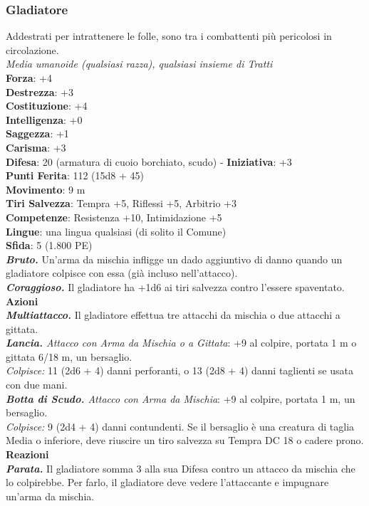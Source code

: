 \begin{multicols}{2}
\subsubsection{Gladiatore}
Addestrati per intrattenere le folle, sono tra i combattenti più pericolosi in circolazione.\\
\emph{Media umanoide (qualsiasi razza), qualsiasi insieme di Tratti}\\
\textbf{Forza}: +4\\
\textbf{Destrezza}: +3\\
\textbf{Costituzione}: +4\\
\textbf{Intelligenza}: +0\\
\textbf{Saggezza}: +1\\
\textbf{Carisma}: +3\\
\textbf{Difesa}: 20 (armatura di cuoio borchiato, scudo) - \textbf{Iniziativa}: +3\\
\textbf{Punti Ferita}: 112 (15d8 + 45)\\
\textbf{Movimento}: 9 m\\
\textbf{Tiri Salvezza}: Tempra +5, Riflessi +5, Arbitrio +3 \\
\textbf{Competenze}: Resistenza +10, Intimidazione +5\\
\textbf{Lingue}: una lingua qualsiasi (di solito il Comune)\\
\textbf{Sfida}: 5 (1.800 PE)\smallskip\\
\emph{\textbf{Bruto.}} Un'arma da mischia infligge un dado aggiuntivo di danno quando un gladiatore colpisce con essa (già incluso nell'attacco).\\
\emph{\textbf{Coraggioso.}} Il gladiatore ha +1d6 ai tiri salvezza contro l'essere spaventato.\\
\smallskip\textbf{Azioni}\\
\emph{\textbf{Multiattacco.}} Il gladiatore effettua tre attacchi da mischia o due attacchi a gittata.\\
\emph{\textbf{Lancia.} Attacco con Arma da Mischia o a Gittata}: +9 al colpire, portata 1 m o gittata 6/18 m, un bersaglio.\\
\emph{Colpisce:} 11 (2d6 + 4) danni perforanti, o 13 (2d8 + 4) danni taglienti se usata con due mani.\\
\emph{\textbf{Botta di Scudo.} Attacco con Arma da Mischia}: +9 al colpire, portata 1 m, un bersaglio.\\
\emph{Colpisce:} 9 (2d4 + 4) danni contundenti. Se il bersaglio è una creatura di taglia Media o inferiore, deve riuscire un tiro salvezza su Tempra DC  18 o cadere prono.\\
\textbf{Reazioni}\\
\emph{\textbf{Parata.}} Il gladiatore somma 3 alla sua Difesa contro un attacco da mischia che lo colpirebbe. Per farlo, il gladiatore deve vedere l'attaccante e impugnare un'arma da mischia.\\


\end{multicols}
